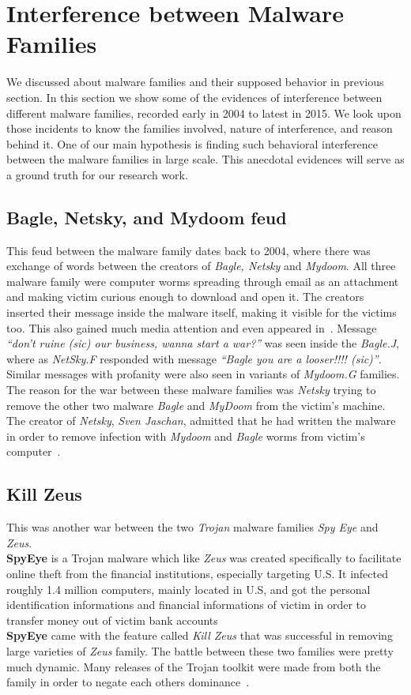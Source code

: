 \section{Interference between Malware Families}
\label{sec:Interference between Malware Families}
We discussed about malware families and their supposed behavior in previous section.
In this section we show some of the evidences of interference between different malware families, recorded early in 2004 to latest in 2015.
We look upon those incidents to know the families involved, nature of interference, and reason behind it.
One of our main hypothesis is finding such behavioral interference between the malware families in large scale.
This anecdotal evidences will serve as a ground truth for our research work.
\subsection{Bagle, Netsky, and Mydoom feud}
\label{sub:Bagle, Netsky, and Mydoom feud}
This feud between the malware family dates back to 2004, where there was exchange of words between the creators of \emph{Bagle, Netsky} and \emph{Mydoom}.
All three malware family were computer worms spreading through email as an attachment and making victim curious enough to download and open it.
The creators inserted their message inside the malware itself, making it visible for the victims too. This also gained much media attention and even appeared in~\cite[BBC]{bbccover}.
Message \emph{``don't ruine (sic) our business, wanna start a war?''} was seen inside the \emph{Bagle.J}, where as \emph{NetSky.F} responded with message \emph{``Bagle \- you are a looser!!!! (sic)''}.
Similar messages with profanity were also seen in variants of \emph{Mydoom.G} families.\\
The reason for the war between these malware families was \emph{Netsky} trying to remove the other two malware \emph{Bagle} and \emph{MyDoom} from the victim's machine.
The creator of \emph{Netsky}, \emph{Sven Jaschan}, admitted that he had written the malware in order to remove infection with \emph{Mydoom} and \emph{Bagle} worms from victim's computer~\cite[]{wikinetsky}.\\
\subsection{Kill Zeus}
\label{sub:Kill Zeus}
This was another war between the two \emph{Trojan} malware families \emph{Spy Eye} and \emph{Zeus}.\\
\textbf{SpyEye} is a Trojan malware which like \emph{Zeus} was created specifically to facilitate online theft from the financial institutions, especially targeting U.S.
It infected roughly 1.4 million computers, mainly located in U.S, and got the personal identification informations and financial informations of victim in order to transfer money out of victim bank accounts~\cite[]{fbispyeye} \\
\textbf{SpyEye} came with the feature called \emph{Kill Zeus} that was successful in removing large varieties of \emph{Zeus} family.
The battle between these two families were pretty much dynamic.
Many releases of the Trojan toolkit were made from both the family in order to negate each others dominance~\cite[]{sanszeus}.
